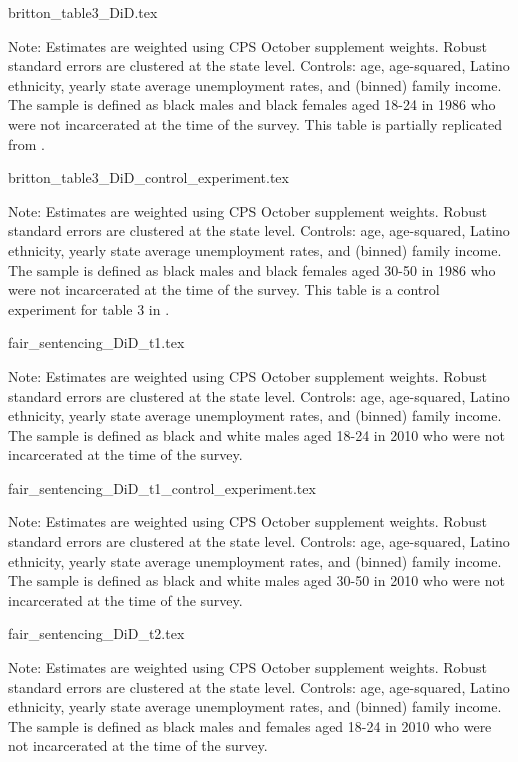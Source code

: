 {britton_table3_DiD.tex}
\begin{footnotesize}
  \noindent Note: Estimates are weighted using CPS October supplement weights. Robust standard errors are clustered at the state level. Controls: age, age-squared, Latino ethnicity, yearly state average unemployment rates, and (binned) family income. The sample is defined as black males and black females aged 18-24 in 1986 who were not incarcerated at the time of the survey.
  This table is partially replicated from \cite{britton2022}.
\end{footnotesize}


{britton_table3_DiD_control_experiment.tex}
\begin{footnotesize}
  \noindent Note: Estimates are weighted using CPS October supplement weights. Robust standard errors are clustered at the state level. Controls: age, age-squared, Latino ethnicity, yearly state average unemployment rates, and (binned) family income. The sample is defined as black males and black females aged 30-50 in 1986 who were not incarcerated at the time of the survey.
  This table is a control experiment for table 3 in \cite{britton2022}.
\end{footnotesize}
\clearpage

{fair_sentencing_DiD_t1.tex}
\begin{footnotesize}
  \noindent Note: Estimates are weighted using CPS October supplement weights. Robust standard errors are clustered at the state level. Controls: age, age-squared, Latino ethnicity, yearly state average unemployment rates, and (binned) family income. The sample is defined as black and white males aged 18-24 in 2010 who were not incarcerated at the time of the survey.
\end{footnotesize}

{fair_sentencing_DiD_t1_control_experiment.tex}
\begin{footnotesize}
  \noindent Note: Estimates are weighted using CPS October supplement weights. Robust standard errors are clustered at the state level. Controls: age, age-squared, Latino ethnicity, yearly state average unemployment rates, and (binned) family income. The sample is defined as black and white males aged 30-50 in 2010 who were not incarcerated at the time of the survey.
\end{footnotesize}
\clearpage

{fair_sentencing_DiD_t2.tex}
\begin{footnotesize}
  \noindent Note: Estimates are weighted using CPS October supplement weights. Robust standard errors are clustered at the state level. Controls: age, age-squared, Latino ethnicity, yearly state average unemployment rates, and (binned) family income. The sample is defined as black males and females aged 18-24 in 2010 who were not incarcerated at the time of the survey.
\end{footnotesize}

